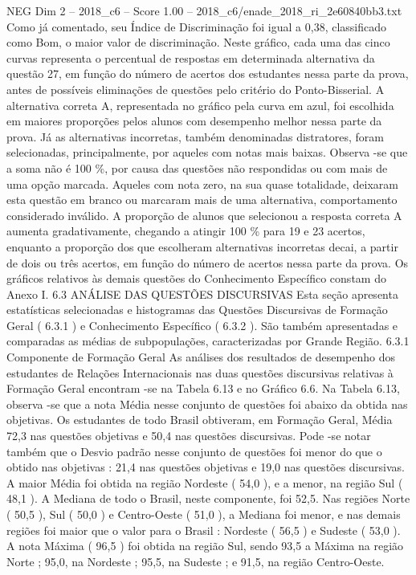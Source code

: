 \begin{textsample}{NEG Dim 2 – 2018\_c6 – Score 1.00 – 2018\_c6/enade\_2018\_ri\_2e60840bb3.txt}
Como já comentado, seu Índice de Discriminação foi igual a 0,38, classificado como Bom, o maior valor de discriminação.
Neste gráfico, cada uma das cinco curvas representa o percentual de respostas em determinada alternativa da questão 27, em função do número de acertos dos estudantes nessa parte da prova, antes de possíveis eliminações de questões pelo critério do Ponto-Bisserial.
A alternativa correta A, representada no gráfico pela curva em azul, foi escolhida em maiores proporções pelos alunos com desempenho melhor nessa parte da prova.
Já as alternativas incorretas, também denominadas distratores, foram selecionadas, principalmente, por aqueles com notas mais baixas.
Observa -se que a soma não é 100 \%, por causa das questões não respondidas ou com mais de uma opção marcada.
Aqueles com nota zero, na sua quase totalidade, deixaram esta questão em branco ou marcaram mais de uma alternativa, comportamento considerado inválido.
A proporção de alunos que selecionou a resposta correta A aumenta gradativamente, chegando a atingir 100 \% para 19 e 23 acertos, enquanto a proporção dos que escolheram alternativas incorretas decai, a partir de dois ou três acertos, em função do número de acertos nessa parte da prova.
Os gráficos relativos às demais questões do Conhecimento Específico constam do Anexo I. 6.3 ANÁLISE DAS QUESTÕES DISCURSIVAS Esta seção apresenta estatísticas selecionadas e histogramas das Questões Discursivas de Formação Geral ( 6.3.1 ) e Conhecimento Específico ( 6.3.2 ).
São também apresentadas e comparadas as médias de subpopulações, caracterizadas por Grande Região. 6.3.1 Componente de Formação Geral As análises dos resultados de desempenho dos estudantes de Relações Internacionais nas duas questões discursivas relativas à Formação Geral encontram -se na Tabela 6.13 e no Gráfico 6.6.
Na Tabela 6.13, observa -se que a nota Média nesse conjunto de questões foi abaixo da obtida nas objetivas.
Os estudantes de todo Brasil obtiveram, em Formação Geral, Média 72,3 nas questões objetivas e 50,4 nas questões discursivas.
Pode -se notar também que o Desvio padrão nesse conjunto de questões foi menor do que o obtido nas objetivas : 21,4 nas questões objetivas e 19,0 nas questões discursivas.
A maior Média foi obtida na região Nordeste ( 54,0 ), e a menor, na região Sul ( 48,1 ).
A Mediana de todo o Brasil, neste componente, foi 52,5.
Nas regiões Norte ( 50,5 ), Sul ( 50,0 ) e Centro-Oeste ( 51,0 ), a Mediana foi menor, e nas demais regiões foi maior que o valor para o Brasil : Nordeste ( 56,5 ) e Sudeste ( 53,0 ).
A nota Máxima ( 96,5 ) foi obtida na região Sul, sendo 93,5 a Máxima na região Norte ; 95,0, na Nordeste ; 95,5, na Sudeste ; e 91,5, na região Centro-Oeste.

\end{textsample}
